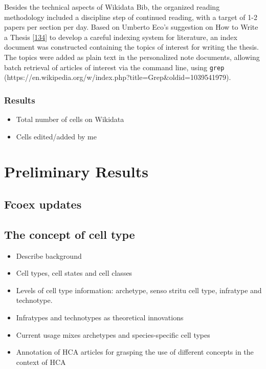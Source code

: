 Besides the technical aspects of Wikidata Bib, the organized reading methodology included a discipline step of continued reading, with a target of 1-2 papers per section per day. Based on Umberto Eco's suggestion on How to Write a Thesis {[}\protect\hyperlink{ref-1HBVPtZGp}{134}{]} to develop a careful indexing system for literature, an index document was constructed containing the topics of interest for writing the thesis. The topics were added as plain text in the personalized note documents, allowing batch retrieval of articles of interest via the command line, using \texttt{grep} (https://en.wikipedia.org/w/index.php?title=Grep\&oldid=1039541979).

\hypertarget{results}{%
\subsubsection{Results}\label{results}}

\begin{itemize}
\tightlist
\item
  Total number of cells on Wikidata
\item
  Cells edited/added by me
\end{itemize}

\hypertarget{preliminary-results-1}{%
\section{Preliminary Results}\label{preliminary-results-1}}

\hypertarget{fcoex-updates}{%
\subsection{Fcoex updates}\label{fcoex-updates}}

\hypertarget{the-concept-of-cell-type}{%
\subsection{The concept of cell type}\label{the-concept-of-cell-type}}

\begin{itemize}
\tightlist
\item
  Describe background
\item
  Cell types, cell states and cell classes
\item
  Levels of cell type information: archetype, senso stritu cell type, infratype and technotype.
\item
  Infratypes and technotypes as theoretical innovations
\item
  Current usage mixes archetypes and species-specific cell types
\item
  Annotation of HCA articles for grasping the use of different concepts in the context of HCA
\end{itemize}

